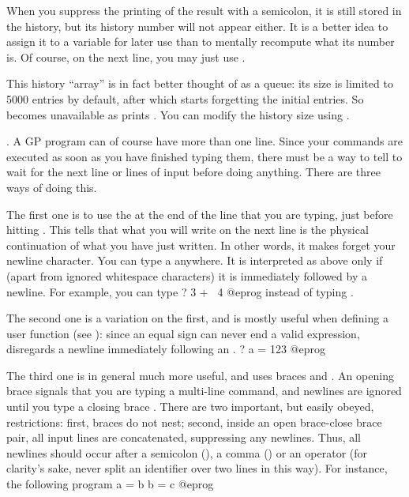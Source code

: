 When you suppress the printing of the result with a semicolon, it is still
stored in the history, but its history number will not appear either. It is a
better idea to assign it to a variable for later use than to mentally
recompute what its number is. Of course, on the next line, you may just use
\kbd{\%}.

This history ``array'' is in fact better thought of as a queue: its size is
limited to 5000 entries by default, after which  starts forgetting
the initial entries. So  becomes unavailable as  prints
. You can modify the history size using .

. A GP program
can of course have more than one line. Since your commands are executed as
soon as you have finished typing them, there must be a way to tell 
to wait for the next line or lines of input before doing anything. There are
three ways of doing this.

The first one is to use the  \kbd{\bs} at the end of
the line that you are typing, just before hitting . This tells
 that what you will write on the next line is the physical
continuation of what you have just written. In other words, it makes 
forget your newline character. You can type a \kbd{\bs} anywhere. It is
interpreted as above only if (apart from ignored whitespace characters) it is
immediately followed by a newline. For example, you can type
\bprog
? 3 + \
4
@eprog
\noindent instead of typing .

The second one is a variation on the first, and is mostly useful when
defining a user function (see \secref{se:user_defined}): since an equal sign
can never end a valid expression, \kbd{gp} disregards a newline immediately
following an \kbd{=}.
\bprog
? a =
123
@eprog

The third one is in general much more useful, and uses braces \kbd{\obr} and
\kbd{\cbr}.\sidx{brace characters} An opening brace \kbd{\obr} signals that
you are typing a multi-line command, and newlines are ignored until you type
a closing brace \kbd{\cbr}. There are two important, but easily obeyed,
restrictions: first, braces do not nest; second, inside an open brace-close
brace pair, all input lines are concatenated, suppressing any newlines. Thus,
all newlines should occur after a semicolon (\kbd{;}), a comma (\kbd{,}) or
an operator (for clarity's sake, never split an identifier over two lines in
this way). For instance, the following program
\bprog
{
  a = b
  b = c
}
@eprog

